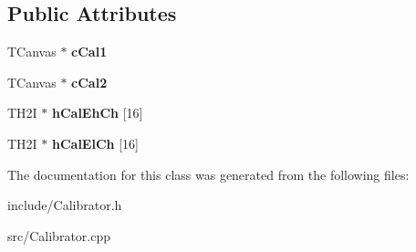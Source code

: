 \subsection*{Public Attributes}
\begin{DoxyCompactItemize}
\item 
\hypertarget{classCalibrator_ab27b862c4935a294ed3af3f4af403b14}{T\-Canvas $\ast$ {\bfseries c\-Cal1}}\label{classCalibrator_ab27b862c4935a294ed3af3f4af403b14}

\item 
\hypertarget{classCalibrator_a5aa5107d3c8b1289875eda333c0cbd36}{T\-Canvas $\ast$ {\bfseries c\-Cal2}}\label{classCalibrator_a5aa5107d3c8b1289875eda333c0cbd36}

\item 
\hypertarget{classCalibrator_a38927f290627b19e050c2e02af263c50}{T\-H2\-I $\ast$ {\bfseries h\-Cal\-Eh\-Ch} \mbox{[}16\mbox{]}}\label{classCalibrator_a38927f290627b19e050c2e02af263c50}

\item 
\hypertarget{classCalibrator_a99e1ce1b258fe04ca7700f08812a45d6}{T\-H2\-I $\ast$ {\bfseries h\-Cal\-El\-Ch} \mbox{[}16\mbox{]}}\label{classCalibrator_a99e1ce1b258fe04ca7700f08812a45d6}

\end{DoxyCompactItemize}


The documentation for this class was generated from the following files\-:\begin{DoxyCompactItemize}
\item 
include/Calibrator.\-h\item 
src/Calibrator.\-cpp\end{DoxyCompactItemize}
